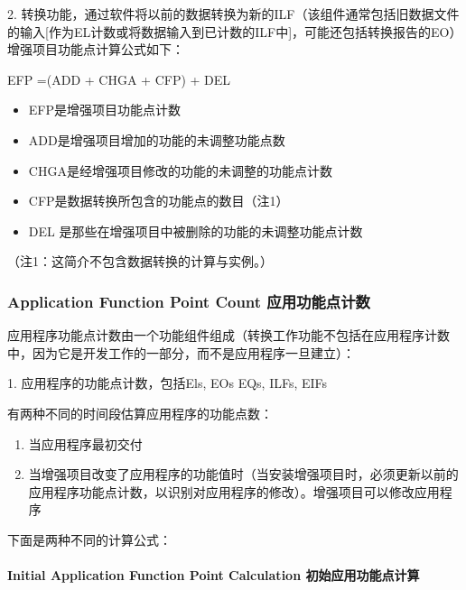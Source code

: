 \documentclass{book}        %
\providecommand{\tightlist}{%
  \setlength{\itemsep}{0pt}\setlength{\parskip}{0pt}}
\let\oldparagraph\paragraph
\renewcommand{\paragraph}[1]{\oldparagraph{#1}\mbox{}}
\begin{document}
2.
转换功能，通过软件将以前的数据转换为新的ILF（该组件通常包括旧数据文件的输入{[}作为EL计数或将数据输入到已计数的ILF中{]}，可能还包括转换报告的EO）\\
增强项目功能点计算公式如下：

EFP =(ADD + CHGA + CFP) + DEL

\begin{itemize}
\tightlist
\item
  EFP是增强项目功能点计数
\item
  ADD是增强项目增加的功能的未调整功能点数
\item
  CHGA是经增强项目修改的功能的未调整的功能点计数
\item
  CFP是数据转换所包含的功能点的数目（注1）
\item
  DEL 是那些在增强项目中被删除的功能的未调整功能点计数
\end{itemize}

\begin{description}
\tightlist
\item[]
（注1：这简介不包含数据转换的计算与实例。）
\end{description}

\hypertarget{application-function-point-count-ux5e94ux7528ux529fux80fdux70b9ux8ba1ux6570}{%
\subsubsection{Application Function Point Count
应用功能点计数}\label{application-function-point-count-ux5e94ux7528ux529fux80fdux70b9ux8ba1ux6570}}

应用程序功能点计数由一个功能组件组成（转换工作功能不包括在应用程序计数中，因为它是开发工作的一部分，而不是应用程序一旦建立）：

1. 应用程序的功能点计数，包括Els, EOs EQs, ILFs, EIFs

有两种不同的时间段估算应用程序的功能点数：

\begin{enumerate}
\tightlist
\item
  当应用程序最初交付
\item
  当增强项目改变了应用程序的功能值时（当安装增强项目时，必须更新以前的应用程序功能点计数，以识别对应用程序的修改）。增强项目可以修改应用程序
\end{enumerate}

下面是两种不同的计算公式：

\hypertarget{initial-application-function-point-calculation-ux521dux59cbux5e94ux7528ux529fux80fdux70b9ux8ba1ux7b97}{%
\paragraph{Initial Application Function Point Calculation
初始应用功能点计算}\label{initial-application-function-point-calculation-ux521dux59cbux5e94ux7528ux529fux80fdux70b9ux8ba1ux7b97}}
\end{document}
